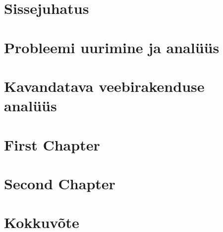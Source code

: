 \chapter{Sissejuhatus}\label{chapter:introduction}


\chapter{Probleemi uurimine ja analüüs}\label{chapter:theory}


\chapter{Kavandatava veebirakenduse analüüs}\label{chapter:analysis}


\chapter{First Chapter}\label{chapter:first_chapter}


\chapter{Second Chapter}\label{chapter:second_chapter}


\chapter{Kokkuvõte}\label{chapter:summary} 

